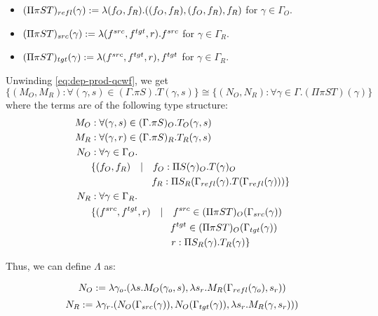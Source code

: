 \documentclass[12pt,a4paper]{article}
\def\src{_{src}}\alwaysmath{src}
\def\rfl{_{refl}}\alwaysmath{rfl}
\def\tgt{_{tgt}}\alwaysmath{tgt}
\renewcommand{\O}{_{O}}
\newcommand{\R}{\ensuremath{_{R}}}
\begin{document}
\begin{itemize}
    \item $(\Pi \pi S T)\rfl(\gamma) \define \lambda (f\O, f\R). ((f\O, f\R), (f\O, f\R), f\R) $ for $\gamma \in \Gamma\O$.
    
    \item $(\Pi \pi S T)\src(\gamma) \define \lambda (f^{src}, f^{tgt}, r). f^{src}$ for $\gamma \in \Gamma\R$.
    
    \item $(\Pi \pi S T)\tgt(\gamma) \define \lambda (f^{src}, f^{tgt}, r), f^{tgt}$ for $\gamma \in \Gamma\R$.
\end{itemize}

\pagebreak

Unwinding \cref{eq:dep-prod-qcwf}, we get 
$$\{(M\O,M\R) : \forall (\gamma, s) \in (\Gamma. \pi S) . T(\gamma, s) \} \cong \{(N\O, N\R) : \forall \gamma \in \Gamma . (\Pi \pi S T)(\gamma)\}$$
where the terms are of the following type structure:
\begin{align*}
  M\O &: \forall (\gamma, s) \in (\Gamma. \pi S)\O . T\O(\gamma, s) \\
  M\R &: \forall (\gamma, r) \in (\Gamma. \pi S)\R . T\R(\gamma, s) \\
  N\O &: \forall \gamma \in \Gamma\O .\\
  &\{ (f\O , f\R) \quad|\quad f\O : \Pi S(\gamma)\O.T(\gamma)\O\\
  &\hspace{6.2em}  f\R : \Pi S\R (\Gamma\rfl(\gamma).T(\Gamma\rfl(\gamma))) \} \\
  N\R &: \forall \gamma \in \Gamma\R.\\
  &\{ (f^{src}, f^{tgt} , r) \quad|\quad  f^{src} \in (\Pi \pi S T)\O(\Gamma\src(\gamma))\\
  &\hspace{8.1em}   f^{tgt} \in (\Pi \pi S T)\O(\Gamma\tgt(\gamma))\\
  &\hspace{8.2em}   r : \Pi S\R (\gamma).T\R(\gamma)\}
\end{align*}

Thus, we can define $\Lambda$ as:

$$N\O \define \lambda \gamma_o . (\lambda s. M\O(\gamma_o, s), \lambda s_r. M\R(\Gamma\rfl(\gamma_o), s_r))$$
$$N\R \define \lambda \gamma_r . ( N\O(\Gamma\src(\gamma)), N\O(\Gamma\tgt(\gamma)),  \lambda s_r. M\R(\gamma, s_r)) )$$
\end{document}
